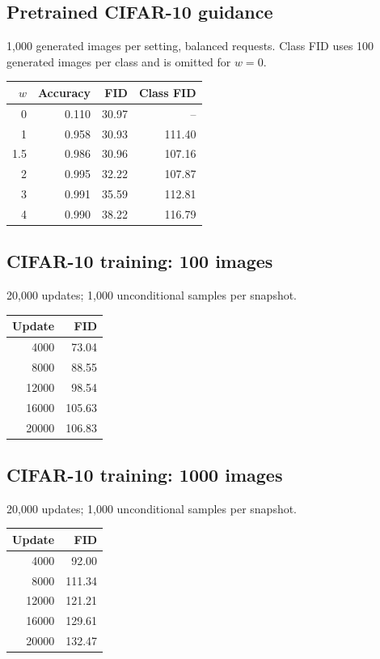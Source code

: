 \subsection{Pretrained CIFAR-10 guidance}

1,000 generated images per setting, balanced requests. Class FID uses 100 generated images per class and is omitted for $w=0$.

\begin{center}
\begin{tabular}{rrrr}
\hline
$w$ & Accuracy & FID & Class FID \\
\hline
0 & 0.110 & 30.97 & -- \\
1 & 0.958 & 30.93 & 111.40 \\
1.5 & 0.986 & 30.96 & 107.16 \\
2 & 0.995 & 32.22 & 107.87 \\
3 & 0.991 & 35.59 & 112.81 \\
4 & 0.990 & 38.22 & 116.79 \\
\hline
\end{tabular}
\end{center}

\subsection{CIFAR-10 training: 100 images}

20,000 updates; 1,000 unconditional samples per snapshot.

\begin{center}
\begin{tabular}{rr}
\hline
Update & FID \\
\hline
4000 & 73.04 \\
8000 & 88.55 \\
12000 & 98.54 \\
16000 & 105.63 \\
20000 & 106.83 \\
\hline
\end{tabular}
\end{center}

\subsection{CIFAR-10 training: 1000 images}

20,000 updates; 1,000 unconditional samples per snapshot.

\begin{center}
\begin{tabular}{rr}
\hline
Update & FID \\
\hline
4000 & 92.00 \\
8000 & 111.34 \\
12000 & 121.21 \\
16000 & 129.61 \\
20000 & 132.47 \\
\hline
\end{tabular}
\end{center}

